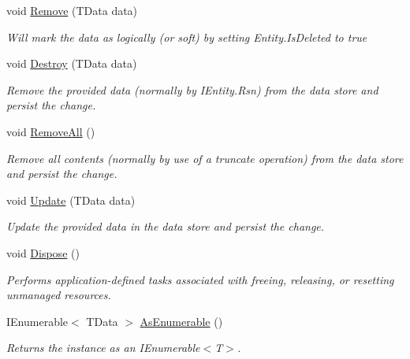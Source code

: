 \begin{DoxyCompactItemize}
void \hyperlink{classCqrs_1_1Azure_1_1DocumentDb_1_1DataStores_1_1AzureDocumentDbDataStore_abf9bcf75e8e0e1ec86155bf4da1a7b7a_abf9bcf75e8e0e1ec86155bf4da1a7b7a}{Remove} (T\+Data data)
\begin{DoxyCompactList}\small\item\em Will mark the {\itshape data}  as logically (or soft) by setting Entity.\+Is\+Deleted to true \end{DoxyCompactList}\item 
void \hyperlink{classCqrs_1_1Azure_1_1DocumentDb_1_1DataStores_1_1AzureDocumentDbDataStore_affe39fe57e590555256258fa6c568c29_affe39fe57e590555256258fa6c568c29}{Destroy} (T\+Data data)
\begin{DoxyCompactList}\small\item\em Remove the provided {\itshape data}  (normally by I\+Entity.\+Rsn) from the data store and persist the change. \end{DoxyCompactList}\item 
void \hyperlink{classCqrs_1_1Azure_1_1DocumentDb_1_1DataStores_1_1AzureDocumentDbDataStore_a0d72cc318e98e01b3dbed86d412a8778_a0d72cc318e98e01b3dbed86d412a8778}{Remove\+All} ()
\begin{DoxyCompactList}\small\item\em Remove all contents (normally by use of a truncate operation) from the data store and persist the change. \end{DoxyCompactList}\item 
void \hyperlink{classCqrs_1_1Azure_1_1DocumentDb_1_1DataStores_1_1AzureDocumentDbDataStore_a55f504ed5094e3041a266b958424b1a2_a55f504ed5094e3041a266b958424b1a2}{Update} (T\+Data data)
\begin{DoxyCompactList}\small\item\em Update the provided {\itshape data}  in the data store and persist the change. \end{DoxyCompactList}\item 
void \hyperlink{classCqrs_1_1Azure_1_1DocumentDb_1_1DataStores_1_1AzureDocumentDbDataStore_ade945ac02451a490711367dbe54d4132_ade945ac02451a490711367dbe54d4132}{Dispose} ()
\begin{DoxyCompactList}\small\item\em Performs application-\/defined tasks associated with freeing, releasing, or resetting unmanaged resources. \end{DoxyCompactList}\item 
I\+Enumerable$<$ T\+Data $>$ \hyperlink{classCqrs_1_1Azure_1_1DocumentDb_1_1DataStores_1_1AzureDocumentDbDataStore_acbe24a7d0def44ca4826bbf5658a6054_acbe24a7d0def44ca4826bbf5658a6054}{As\+Enumerable} ()
\begin{DoxyCompactList}\small\item\em Returns the instance as an I\+Enumerable$<$\+T$>$. \end{DoxyCompactList}\end{DoxyCompactItemize}
